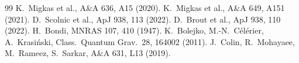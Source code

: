 \documentclass[10pt,twocolumn,letterpaper]{article}
\begin{document}
\begin{thebibliography}{99}\scriptsize\setlength{\itemsep}{0pt}
 K.~Migkas et al., A\&A 636, A15 (2020).
 K.~Migkas et al., A\&A 649, A151 (2021).
 D.~Scolnic et al., ApJ 938, 113 (2022).
 D.~Brout et al., ApJ 938, 110 (2022).
 H.~Bondi, MNRAS 107, 410 (1947).
 K.~Bolejko, M.-N.~C\'el\'erier, A.~Krasi\'nski, Class.\ Quantum Grav.\ 28, 164002 (2011).
 J.~Colin, R.~Mohayaee, M.~Rameez, S.~Sarkar, A\&A 631, L13 (2019).
\end{thebibliography}
\end{document}
